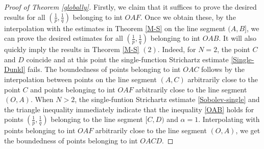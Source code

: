 \documentclass[a4paper,11pt, reqno]{amsart}
\numberwithin{equation}{section}
\theoremstyle{plain}
\theoremstyle{definition}
\theoremstyle{remark}
\begin{document}
\begin{proof}[Proof of Theorem \ref{globally}]
Firstly, we claim that it suffices to prove the desired results for all $(\frac{1}{p},\frac{1}{q})$ belonging to int $OAF$. Once we obtain these, by the interpolation with the estimates in Theorem \ref{M-S} on the line segment $(A,B]$, we can prove the desired estimates for all $(\frac{1}{p},\frac{1}{q})$ belonging to int $OAB$. It will also quickly imply the results in Theorem \ref{M-S} $(2)$. Indeed, for $N=2$, the point $C$ and $D$ coincide and at this point the single-function Strichartz estimate \eqref{Single-Dunkl} fails. The boundedness of points belonging to int $OAC$ follows by the interpolation between points on the line segment $(A,C)$ arbitrarily close to the point $C$ and points belonging to int $OAF$ arbitrarily close to the line segment $(O,A)$. When $N>2$, the single-funtion Strichartz estimate \eqref{Sobolev-single} and the triangle inequality immediately indicate that the inequality \eqref{OAB} holds for points $(\frac{1}{p},\frac{1}{q})$ belonging to the line segment $[C,D)$ and $\alpha=1$. Interpolating with points belonging to int $OAF$ arbitrarily close to the line segment $(O,A)$, we get the boundedness of points belonging to int $OACD$.


\end{proof}
\end{document}
